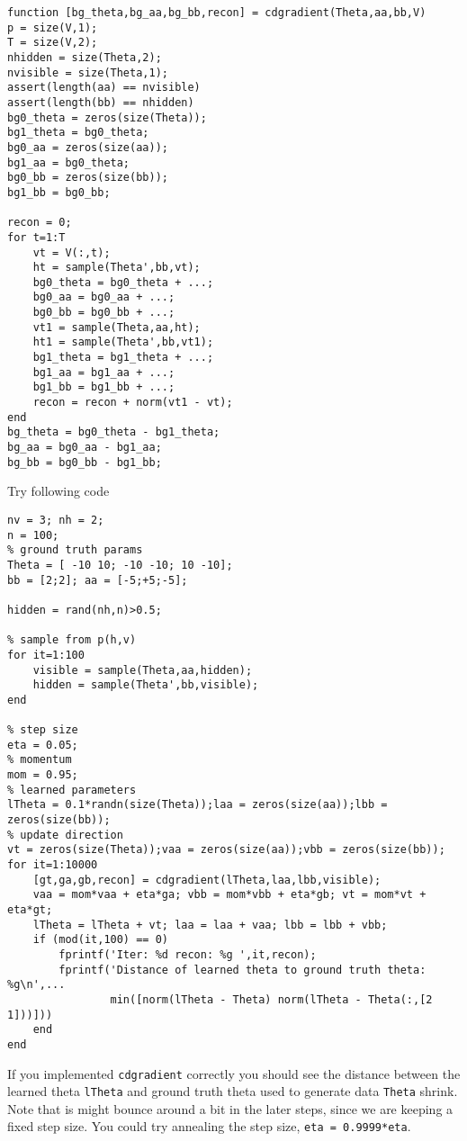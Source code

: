 \documentclass{article}
\begin{document}
\begin{verbatim}
function [bg_theta,bg_aa,bg_bb,recon] = cdgradient(Theta,aa,bb,V)
p = size(V,1);
T = size(V,2);
nhidden = size(Theta,2);
nvisible = size(Theta,1);
assert(length(aa) == nvisible)
assert(length(bb) == nhidden)
bg0_theta = zeros(size(Theta));
bg1_theta = bg0_theta;
bg0_aa = zeros(size(aa));
bg1_aa = bg0_theta;
bg0_bb = zeros(size(bb));
bg1_bb = bg0_bb;

recon = 0;
for t=1:T
    vt = V(:,t);
    ht = sample(Theta',bb,vt);
    bg0_theta = bg0_theta + ...;
    bg0_aa = bg0_aa + ...;
    bg0_bb = bg0_bb + ...;
    vt1 = sample(Theta,aa,ht);
    ht1 = sample(Theta',bb,vt1);
    bg1_theta = bg1_theta + ...;
    bg1_aa = bg1_aa + ...;
    bg1_bb = bg1_bb + ...;
    recon = recon + norm(vt1 - vt);
end
bg_theta = bg0_theta - bg1_theta;
bg_aa = bg0_aa - bg1_aa;
bg_bb = bg0_bb - bg1_bb;
\end{verbatim}




Try following code
\begin{verbatim}
nv = 3; nh = 2;
n = 100;
% ground truth params
Theta = [ -10 10; -10 -10; 10 -10];
bb = [2;2]; aa = [-5;+5;-5];

hidden = rand(nh,n)>0.5;

% sample from p(h,v)
for it=1:100
    visible = sample(Theta,aa,hidden);
    hidden = sample(Theta',bb,visible);
end

% step size
eta = 0.05;
% momentum
mom = 0.95;
% learned parameters
lTheta = 0.1*randn(size(Theta));laa = zeros(size(aa));lbb = zeros(size(bb));
% update direction
vt = zeros(size(Theta));vaa = zeros(size(aa));vbb = zeros(size(bb));
for it=1:10000
    [gt,ga,gb,recon] = cdgradient(lTheta,laa,lbb,visible);
    vaa = mom*vaa + eta*ga; vbb = mom*vbb + eta*gb; vt = mom*vt + eta*gt;
    lTheta = lTheta + vt; laa = laa + vaa; lbb = lbb + vbb;
    if (mod(it,100) == 0)
        fprintf('Iter: %d recon: %g ',it,recon);
        fprintf('Distance of learned theta to ground truth theta: %g\n',...
                min([norm(lTheta - Theta) norm(lTheta - Theta(:,[2 1]))]))
    end
end
\end{verbatim}

If you implemented \verb|cdgradient| correctly you should see the distance between the
learned theta \verb|lTheta| and ground truth theta used to generate data \verb|Theta| shrink.
Note that is might bounce around a bit in the later steps, since we are keeping a fixed
step size. You could try annealing the step size, \eg \verb|eta = 0.9999*eta|.
\end{document}
